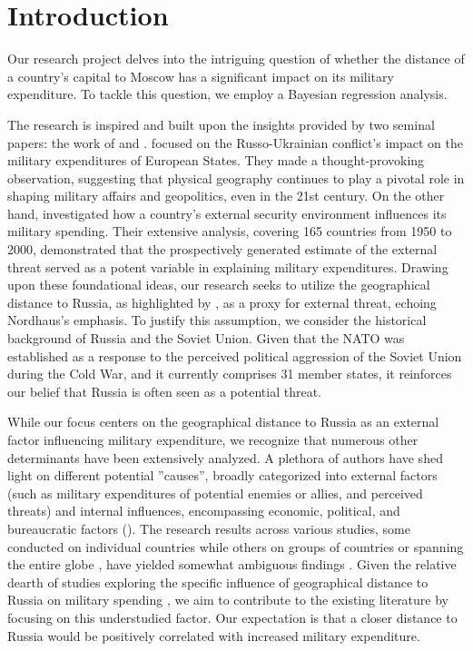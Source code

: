 \documentclass[12pt,a4paper]{article}
\begin{document}
\section{Introduction}

Our research project delves into the intriguing question of whether the distance of a country's capital to Moscow has a significant impact on its military expenditure. To tackle this question, we employ a Bayesian regression analysis.

The research is inspired and built upon the insights provided by two seminal papers: the work of \citet{kofrovn2023} and \citet{nordhaus2012}. \citet{kofrovn2023} focused on the Russo-Ukrainian conflict's impact on the military expenditures of European States. They made a thought-provoking observation, suggesting that physical geography continues to play a pivotal role in shaping military affairs and geopolitics, even in the 21st century. On the other hand, \citet{nordhaus2012} investigated how a country's external security environment influences its military spending. Their extensive analysis, covering 165 countries from 1950 to 2000, demonstrated that the prospectively generated estimate of the external threat served as a potent variable in explaining military expenditures. Drawing upon these foundational ideas, our research seeks to utilize the geographical distance to Russia, as highlighted by \citet{kofrovn2023}, as a proxy for external threat, echoing Nordhaus's emphasis. To justify this assumption, we consider the historical background of Russia and the Soviet Union. Given that the NATO was established as a response to the perceived political aggression of the Soviet Union during the Cold War, and it currently comprises 31 member states, it reinforces our belief that Russia is often seen as a potential threat.

While our focus centers on the geographical distance to Russia as an external factor influencing military expenditure, we recognize that numerous other determinants have been extensively analyzed. A plethora of authors have shed light on different potential ''causes'', broadly categorized into external factors (such as military expenditures of potential enemies or allies, and perceived threats) and internal influences, encompassing economic, political, and bureaucratic factors (\citet{nikolaidou2008}). The research results across various studies, some conducted on individual countries while others on groups of countries or spanning the entire globe \citep{nikolaidou2008,george2018,nordhaus2012}, have yielded somewhat ambiguous findings \citep{nikolaidou2008, odehnal2020}. 
Given the relative dearth of studies exploring the specific influence of geographical distance to Russia on military spending \citep{kofrovn2023}, we aim to contribute to the existing literature by focusing on this understudied factor. Our expectation is that a closer distance to Russia would be positively correlated with increased military expenditure.
\end{document}
